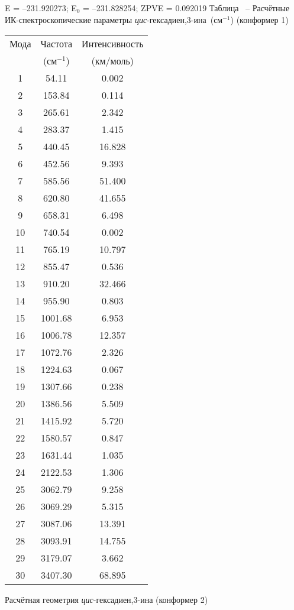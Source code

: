 {E =  --231.920273;    E$_0$ =  --231.828254; ZPVE = 0.092019
\newpage {}
Таблица \thet\, -- Расчётные ИК-спектроскопические параметры {\itshape цис}-гексадиен,3\nobreakdash-ина~(см$^{-1}$) (конформер 1)
 \begin{center}
\begin{tabular}{ccc}
Мода & Частота   & Интенсивность \\
&(см$^{-1}$)&(км/моль)\\
\hline
     1 &   54.11 &   0.002 \\
     2 &  153.84 &    0.114 \\
     3 &  265.61 &    2.342 \\
     4 &  283.37 &   1.415 \\
     5 &  440.45 &   16.828 \\
     6 &  452.56 &   9.393 \\
     7 &  585.56 & 51.400 \\
     8 &  620.80 &   41.655 \\
     9 &  658.31 &    6.498 \\
    10 &  740.54 &    0.002 \\
    11 &  765.19 & 10.797 \\
   12 &  855.47 &     0.536 \\
   13 &  910.20 &    32.466 \\
    14 &  955.90 &   0.803 \\
    15 & 1001.68 &   6.953 \\
    16 & 1006.78 &  12.357 \\
    17 & 1072.76 &    2.326 \\
    18 & 1224.63 &    0.067 \\
    19 & 1307.66 &    0.238 \\
    20 & 1386.56 &    5.509 \\
    21 & 1415.92 &    5.720 \\
    22 & 1580.57 &    0.847 \\
    23 & 1631.44 &   1.035 \\
    24 & 2122.53 &    1.306 \\
    25 & 3062.79 &    9.258 \\
   26 & 3069.29 &    5.315 \\
   27 & 3087.06 &    13.391 \\
    28 & 3093.91 &   14.755 \\
    29 & 3179.07 &    3.662 \\
    30 & 3407.30 &   68.895 \\
 \end{tabular}
\end{center}
\newpage
Расчётная геометрия {\itshape цис}-гексадиен,3\nobreakdash-ина (конформер 2)

}
